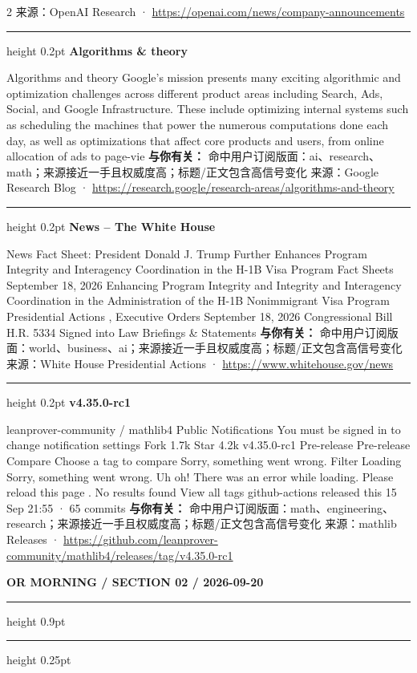 \documentclass[10.5pt]{ctexart}
\begin{document}
\begin{multicols}{2}
{\footnotesize\color{ormuted} 来源：OpenAI Research · \url{https://openai.com/news/company-announcements}}
\vspace{2mm}
\hrule height 0.2pt
\vspace{2mm}
{\large\bfseries Algorithms \& theory}\par
Algorithms and theory Google’s mission presents many exciting algorithmic and optimization challenges across different product areas including Search, Ads, Social, and Google Infrastructure. These include optimizing internal systems such as scheduling the machines that power the numerous computations done each day, as well as optimizations that affect core products and users, from online allocation of ads to page-vie
\textbf{与你有关：} 命中用户订阅版面：ai、research、math；来源接近一手且权威度高；标题/正文包含高信号变化
{\footnotesize\color{ormuted} 来源：Google Research Blog · \url{https://research.google/research-areas/algorithms-and-theory}}
\vspace{2mm}
\hrule height 0.2pt
\vspace{2mm}
{\large\bfseries News – The White House}\par
News Fact Sheet: President Donald J. Trump Further Enhances Program Integrity and Interagency Coordination in the H-1B Visa Program Fact Sheets September 18, 2026 Enhancing Program Integrity and Integrity and Interagency Coordination in the Administration of the H-1B Nonimmigrant Visa Program Presidential Actions , Executive Orders September 18, 2026 Congressional Bill H.R. 5334 Signed into Law Briefings \& Statements
\textbf{与你有关：} 命中用户订阅版面：world、business、ai；来源接近一手且权威度高；标题/正文包含高信号变化
{\footnotesize\color{ormuted} 来源：White House Presidential Actions · \url{https://www.whitehouse.gov/news}}
\vspace{2mm}
\hrule height 0.2pt
\vspace{2mm}
{\large\bfseries v4.35.0-rc1}\par
leanprover-community / mathlib4 Public Notifications You must be signed in to change notification settings Fork 1.7k Star 4.2k v4.35.0-rc1 Pre-release Pre-release Compare Choose a tag to compare Sorry, something went wrong. Filter Loading Sorry, something went wrong. Uh oh! There was an error while loading. Please reload this page . No results found View all tags github-actions released this 15 Sep 21:55 · 65 commits
\textbf{与你有关：} 命中用户订阅版面：math、engineering、research；来源接近一手且权威度高；标题/正文包含高信号变化
{\footnotesize\color{ormuted} 来源：mathlib Releases · \url{https://github.com/leanprover-community/mathlib4/releases/tag/v4.35.0-rc1}}
\end{multicols}
\newpage
{\small\bfseries OR MORNING / SECTION 02 / 2026-09-20}
\vspace{2mm}
\hrule height 0.9pt
\vspace{1.5mm}
\hrule height 0.25pt
\vspace{4mm}
\end{document}
